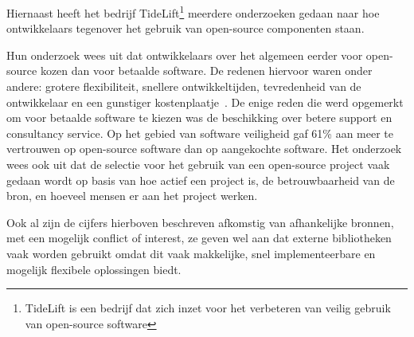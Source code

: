 Hiernaast heeft het bedrijf TideLift\footnote{TideLift is een bedrijf dat zich inzet voor het verbeteren van veilig gebruik van open-source software} meerdere onderzoeken gedaan naar hoe ontwikkelaars tegenover het gebruik van open-source componenten staan.

Hun onderzoek wees uit dat ontwikkelaars over het algemeen eerder voor open-source kozen dan voor betaalde software. De redenen hiervoor waren onder andere: grotere flexibiliteit, snellere ontwikkeltijden, tevredenheid van de ontwikkelaar en een gunstiger kostenplaatje~\citep{TideLift:2021}. De enige reden die werd opgemerkt om voor betaalde software te kiezen was de beschikking over betere support en consultancy service. Op het gebied van software veiligheid gaf 61\% aan meer te vertrouwen op open-source software dan op aangekochte software.
Het onderzoek wees ook uit dat de selectie voor het gebruik van een open-source project vaak gedaan wordt op basis van hoe actief een project is, de betrouwbaarheid van de bron, en hoeveel mensen er aan het project werken.

Ook al zijn de cijfers hierboven beschreven afkomstig van afhankelijke bronnen, met een mogelijk conflict of interest, ze geven wel aan dat externe bibliotheken vaak worden gebruikt omdat dit vaak makkelijke, snel implementeerbare en mogelijk flexibele oplossingen biedt.


